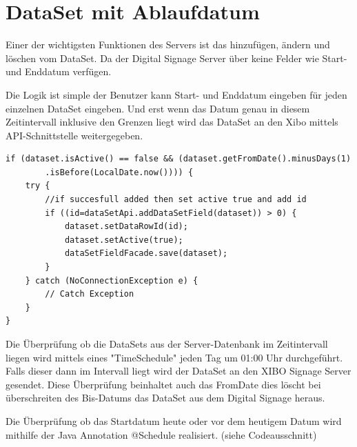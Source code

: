 \section{DataSet mit Ablaufdatum}\label{sec:datasetexpiredate}
Einer der wichtigsten Funktionen des Servers ist das hinzufügen, ändern und löschen vom DataSet. Da der Digital Signage Server über keine Felder wie Start- und Enddatum verfügen.

Die Logik ist simple der Benutzer kann Start- und Enddatum eingeben für jeden einzelnen DataSet eingeben. Und erst wenn das Datum genau in diesem Zeitintervall inklusive den Grenzen liegt wird das DataSet an den Xibo mittels API-Schnittstelle weitergegeben. 

\begin{lstlisting}
if (dataset.isActive() == false && (dataset.getFromDate().minusDays(1)
        .isBefore(LocalDate.now()))) {
    try {
        //if succesfull added then set active true and add id
        if ((id=dataSetApi.addDataSetField(dataset)) > 0) {
            dataset.setDataRowId(id);
            dataset.setActive(true);
            dataSetFieldFacade.save(dataset);
        }
    } catch (NoConnectionException e) {
        // Catch Exception
    }
}
\end{lstlisting}

Die Überprüfung ob die DataSets aus der Server-Datenbank im Zeitintervall liegen wird mittels eines "TimeSchedule" jeden Tag um 01:00 Uhr durchgeführt. Falls dieser dann im Intervall liegt wird der DataSet an den XIBO Signage Server gesendet. Diese Überprüfung beinhaltet auch das FromDate dies löscht bei überschreiten des Bis-Datums das DataSet aus dem Digital Signage heraus. 

Die Überprüfung ob das Startdatum heute oder vor dem heutigem Datum wird mithilfe der Java Annotation @Schedule realisiert. (siehe Codeausschnitt) 


